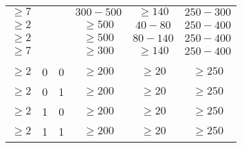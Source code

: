 \begin{table}[!ht]
\begin{center}
{\begin{tabular}{|c|c|c|c|c|c|}
	$\geq7$            &                          &                          & $300-500$               & $\geq140$             & $250-300$            \\
	$\geq2$            &                          &                          & $\geq500$                  & $40-80$            & $250-400$            \\
	$\geq2$            &                          &                          & $\geq500$                  & $80-140$           & $250-400$            \\
	$\geq7$            &                          &                          & $\geq300$                  & $\geq140$             & $250-400$         \\
	\hline
	\multicolumn{6}{|c|}{\meddphi}  \\
	\hline
	$\geq2$			   & 0						& 0						   & $\geq200$					& $\geq20$			& $\geq250$		\\
	$\geq2$			   & 0						& 1						   & $\geq200$					& $\geq20$			& $\geq250$		\\
	$\geq2$			   & 1						& 0						   & $\geq200$					& $\geq20$			& $\geq250$		\\
	$\geq2$			   & 1						& 1						   & $\geq200$					& $\geq20$			& $\geq250$		\\
	\hline
	
\end{tabular}
}
\end{center}
\end{table}

